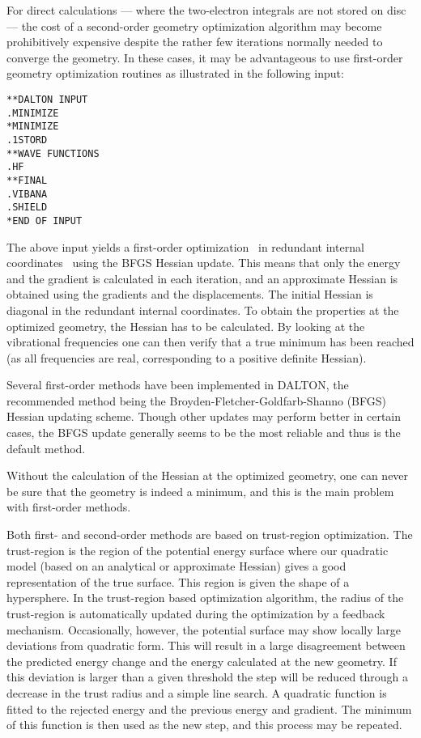 For direct calculations --- where the
two-electron integrals are not stored on disc --- the cost of a
second-order geometry optimization algorithm may become
prohibitively expensive despite the rather few iterations normally
needed to converge the geometry. In these cases, it may be
advantageous to use first-order geometry
optimization routines as
illustrated in the following input:

\begin{verbatim}
**DALTON INPUT
.MINIMIZE
*MINIMIZE
.1STORD
**WAVE FUNCTIONS
.HF
**FINAL
.VIBANA
.SHIELD
*END OF INPUT
\end{verbatim}

The above input yields a first-order
optimization~\cite{Fletcher} in redundant internal
coordinates~\cite{gfxfzpwtppjacs114,ppgfjcp96,vbth} using the BFGS
Hessian update. This means that
only the energy and the gradient is calculated in each iteration, and
an approximate Hessian is obtained using the gradients and the
displacements. The initial Hessian is diagonal in the redundant
internal coordinates. To obtain the properties at the optimized
geometry, the Hessian has to be calculated. By looking at the
vibrational frequencies one can then verify that a true minimum has
been reached (as all frequencies are real, corresponding to a positive
definite Hessian).

Several first-order methods have been implemented in DALTON, the
recommended method being the Broyden-Fletcher-Goldfarb-Shanno (BFGS)
Hessian updating scheme. Though other
updates may perform better in
certain cases, the BFGS update generally seems to be the most
reliable and thus is the default method.

Without the calculation of the Hessian at the optimized geometry, one
can never be sure that the geometry is indeed a minimum, and this is the
main problem with first-order methods.

Both first- and second-order methods are based on
trust-region
optimization. The trust-region is the region of the potential energy
surface where our quadratic model (based on an analytical or
approximate Hessian) gives a good representation of the true
surface. This region is given the shape of a
hypersphere. In the trust-region based optimization algorithm, the
radius of the trust-region is
automatically updated during the optimization by a feedback mechanism.
Occasionally, however, the potential surface may show locally large
deviations from quadratic form. This will result in a large
disagreement between the predicted energy change and the energy
calculated at the new geometry. If this deviation is larger than a
given threshold the step will be reduced through a decrease in the
trust radius and a simple line search. A quadratic function is fitted
to the rejected energy and the previous energy and gradient. The
minimum of this function is then used as the new step, and this
process may be repeated.

